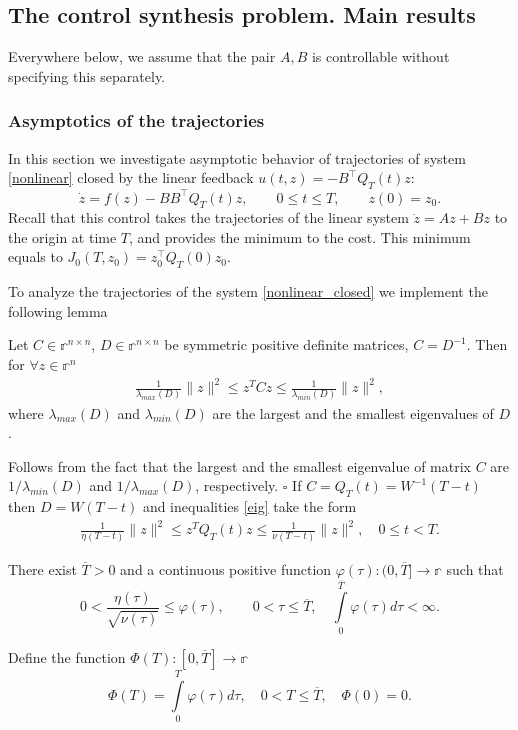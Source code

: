 \documentclass[../main.tex]{subfiles}
\begin{document}
\subsection{The control synthesis problem. Main results}
Everywhere below, we assume that the pair $A,B$ is controllable without specifying this separately.
\subsubsection{Asymptotics of the trajectories}

In this section we  investigate asymptotic behavior of trajectories  of system \eqref{nonlinear} closed by the linear feedback $ u(t,z) = -B^{\top} Q_T(t) z$:
\begin{equation}\label{nonlinear_closed}
	\dot{z} = f(z) - B B^{\top} Q_T(t) z, \qquad 0 \leqslant t \leqslant T, \qquad z(0) = z_0.
\end{equation}
Recall that this control takes the trajectories of the  linear system $\dot{z} = A z + B z$   to the origin at time $T$, and provides the minimum to the cost. This minimum   equals to  $J_0(T,z_0) =z_0^{\top}Q_T(0)z_0$.

To analyze the trajectories of the system \eqref{nonlinear_closed} we  implement the following lemma
\begin{lemma}\label{lem:zqz} 
    Let $C\in \mathbb{r}^{ n \times n}$, $D\in \mathbb{r}^{n \times n}$ be symmetric positive definite matrices, $C=D^{-1}$. Then for $\forall z \in \mathbb{r}^{n}$   
    \begin{gather} \label{eig}
        \frac{1}{\lambda_{max}(D)} \|z\|^2 \leqslant z^T C z \leqslant \frac{1}{\lambda_{min}(D)} \|z\|^2,
    \end{gather}
    where $\lambda_{max}(D)$ and $\lambda_{min}(D)$ are the largest and the smallest eigenvalues of  $D$.
\end{lemma}
\doc
  Follows from the fact that the largest and the smallest eigenvalue of matrix $C$ are $1/{\lambda_{min}(D)}$ and $1/{\lambda_{max}(D)}$, respectively. 
	\hfill $ \square $
If  $C=Q_T(t)=W^{-1}(T-t)$ then $D=W(T-t)$ and inequalities \eqref{eig} take the form
\begin{gather*} %
        \frac{1}{\eta(T-t)} \|z\|^2 \leqslant z^T Q_T(t) z \leqslant \frac{1}{\nu(T-t)} \|z\|^2, \quad 0\leqslant t < T.
    \end{gather*}
\begin{assumption} \label{asm1}   
   There exist $\overline{T}>0$ and  a continuous positive function $\varphi(\tau): (0, \overline{T}] \to \mathbb{r}$ such that
\begin{equation*}
    0 < \frac{\eta(\tau)}{\sqrt{\nu(\tau)}} \leqslant \varphi(\tau), \qquad 0 < \tau \leqslant \overline{T},\quad \int\limits_0^ {\overline{T}}\varphi(\tau) d\tau<\infty.
\end{equation*} 
\end{assumption}
Define the function $\Phi(T): [0, \overline{T}] \to \mathbb{r}$
\begin{equation*}
    \Phi(T)= \int\limits_0^ {T}\varphi(\tau) d\tau,\quad 0 <  T \leqslant \overline{T},\quad  \Phi(0)=0.
\end{equation*} 
\end{document}
